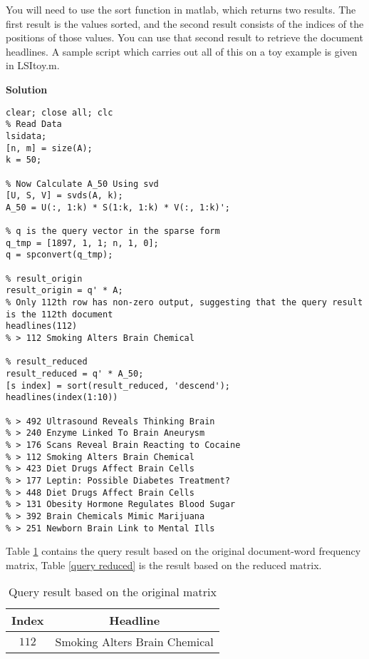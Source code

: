 \documentclass[12pt,oneside,a4paper]{article}
\newcommand{\solution}
{
    \vspace{15pt}
    \noindent\ignorespaces\textbf{\large Solution}\par
}
\begin{document}
You will need to use the sort function in matlab, which returns two results. The first result is the values sorted, and the second result consists of the indices of the positions of those values. You can use that second result to retrieve the document headlines. A sample script which carries out all of this on a toy example is given in LSItoy.m.
\clearpage
\solution
\begin{lstlisting}
clear; close all; clc
% Read Data
lsidata;
[n, m] = size(A);
k = 50;

% Now Calculate A_50 Using svd
[U, S, V] = svds(A, k);
A_50 = U(:, 1:k) * S(1:k, 1:k) * V(:, 1:k)';

% q is the query vector in the sparse form
q_tmp = [1897, 1, 1; n, 1, 0];
q = spconvert(q_tmp);

% result_origin
result_origin = q' * A;
% Only 112th row has non-zero output, suggesting that the query result is the 112th document
headlines(112)
% > 112 Smoking Alters Brain Chemical

% result_reduced
result_reduced = q' * A_50;
[s index] = sort(result_reduced, 'descend');
headlines(index(1:10))

% > 492 Ultrasound Reveals Thinking Brain
% > 240 Enzyme Linked To Brain Aneurysm
% > 176 Scans Reveal Brain Reacting to Cocaine
% > 112 Smoking Alters Brain Chemical
% > 423 Diet Drugs Affect Brain Cells
% > 177 Leptin: Possible Diabetes Treatment?
% > 448 Diet Drugs Affect Brain Cells
% > 131 Obesity Hormone Regulates Blood Sugar
% > 392 Brain Chemicals Mimic Marijuana
% > 251 Newborn Brain Link to Mental Ills
\end{lstlisting}

Table \ref{query original} contains the query result based on the original document-word frequency matrix, Table \ref{query reduced} is the result based on the reduced matrix.

\clearpage

\begin{table}[!p]
\centering
\caption{Query result based on the original matrix}
\begin{tabular}{cc}
\toprule
 \multicolumn{1}{c}{ Index } & \multicolumn{1}{c}{ Headline } \\
\midrule
 $112$ & Smoking Alters Brain Chemical \\
\bottomrule
\end{tabular}
\label{query original}
\end{table}
\end{document}

